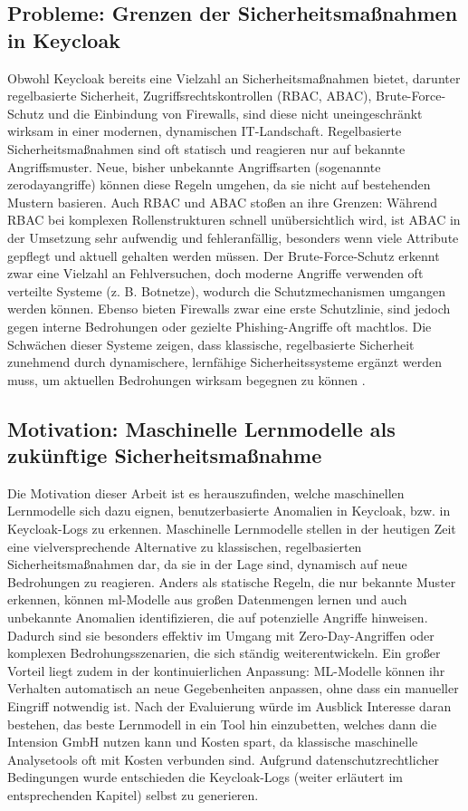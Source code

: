 \documentclass[a4paper,12pt]{article}
\begin{document}
	\subsection{Probleme: Grenzen der Sicherheitsmaßnahmen in Keycloak}
	Obwohl Keycloak bereits eine Vielzahl an Sicherheitsmaßnahmen bietet, darunter regelbasierte Sicherheit, Zugriffsrechtskontrollen (RBAC, ABAC), Brute-Force-Schutz und die Einbindung von Firewalls, sind diese nicht uneingeschränkt wirksam in einer modernen, dynamischen IT-Landschaft. Regelbasierte Sicherheitsmaßnahmen sind oft statisch und reagieren nur auf bekannte Angriffsmuster. Neue, bisher unbekannte Angriffsarten (sogenannte \gls{zerodayangriff}e) können diese Regeln umgehen, da sie nicht auf bestehenden Mustern basieren. Auch RBAC und ABAC stoßen an ihre Grenzen: Während RBAC bei komplexen Rollenstrukturen schnell unübersichtlich wird, ist ABAC in der Umsetzung sehr aufwendig und fehleranfällig, besonders wenn viele Attribute gepflegt und aktuell gehalten werden müssen. Der Brute-Force-Schutz erkennt zwar eine Vielzahl an Fehlversuchen, doch moderne Angriffe verwenden oft verteilte Systeme (z. B. Botnetze), wodurch die Schutzmechanismen umgangen werden können. Ebenso bieten Firewalls zwar eine erste Schutzlinie, sind jedoch gegen interne Bedrohungen oder gezielte Phishing-Angriffe oft machtlos. Die Schwächen dieser Systeme zeigen, dass klassische, regelbasierte Sicherheit zunehmend durch dynamischere, lernfähige Sicherheitssysteme ergänzt werden muss, um aktuellen Bedrohungen wirksam begegnen zu können \cite{nobi2022deep}.
	
	\subsection{Motivation: Maschinelle Lernmodelle als zukünftige Sicherheitsmaßnahme}
	Die Motivation dieser Arbeit ist es herauszufinden, welche maschinellen Lernmodelle sich dazu eignen, benutzerbasierte Anomalien in Keycloak, bzw. in Keycloak-Logs zu erkennen. Maschinelle Lernmodelle stellen in der heutigen Zeit eine vielversprechende Alternative zu klassischen, regelbasierten Sicherheitsmaßnahmen dar, da sie in der Lage sind, dynamisch auf neue Bedrohungen zu reagieren. Anders als statische Regeln, die nur bekannte Muster erkennen, können \gls{ml}-Modelle aus großen Datenmengen lernen und auch unbekannte Anomalien identifizieren, die auf potenzielle Angriffe hinweisen. Dadurch sind sie besonders effektiv im Umgang mit Zero-Day-Angriffen oder komplexen Bedrohungsszenarien, die sich ständig weiterentwickeln. Ein großer Vorteil liegt zudem in der kontinuierlichen Anpassung: ML-Modelle können ihr Verhalten automatisch an neue Gegebenheiten anpassen, ohne dass ein manueller Eingriff notwendig ist.
	Nach der Evaluierung würde im Ausblick Interesse daran bestehen, das beste Lernmodell in ein Tool hin einzubetten, welches dann die Intension GmbH nutzen kann und Kosten spart, da klassische maschinelle Analysetools oft mit Kosten verbunden sind.
	Aufgrund datenschutzrechtlicher Bedingungen wurde entschieden die Keycloak-Logs (weiter erläutert im entsprechenden Kapitel) selbst zu generieren.
	
\end{document}
